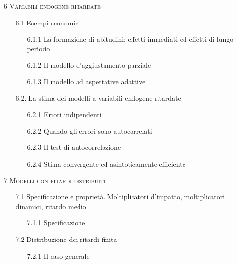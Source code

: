 \documentclass[a4paper,12pt]{article}
\begin{document}
\begin{enumerate}
\item[6] {\large \textsc{Variabili endogene ritardate}}

\begin{enumerate}
\item[6.1] Esempi economici

\begin{enumerate}
\item[6.1.1] La formazione di abitudini: effetti immediati ed effetti di
lungo periodo

\item[6.1.2] Il modello d'aggiustamento parziale

\item[6.1.3] Il modello ad aspettative adattive
\end{enumerate}

\item[6.2.] La stima dei modelli a variabili endogene ritardate

\begin{enumerate}
\item[6.2.1] Errori indipendenti

\item[6.2.2] Quando gli errori sono autocorrelati

\item[6.2.3] Il test di autocorrelazione

\item[6.2.4] Stima convergente ed asintoticamente efficiente
\end{enumerate}
\end{enumerate}

\item[7] {\large \textsc{Modelli con ritardi distribuiti}}

\begin{enumerate}
\item[7.1] Specificazione e propriet\`{a}. Moltiplicatori d'impatto,
moltiplicatori dinamici, ritardo medio

\begin{enumerate}
\item[7.1.1] Specificazione
\end{enumerate}

\item[7.2] Distribuzione dei ritardi finita

\begin{enumerate}
\item[7.2.1] Il caso generale


\end{enumerate}
\end{enumerate}
\end{enumerate}
\end{document}
